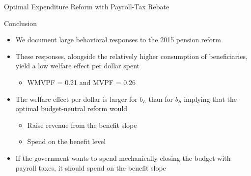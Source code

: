 \begin{frame}{Optimal Expenditure Reform with Payroll-Tax Rebate}
\centering
{}
\end{frame}

\begin{frame}{Conclusion}
    \begin{itemize}
        \item We document large behavioral responses to the 2015 pension reform
        \item These responses, alongside the relatively higher consumption of beneficiaries, yield a low welfare effect per dollar spent
        \begin{itemize}
            \item WMVPF = 0.21 and MVPF = 0.26
        \end{itemize}
        \item The welfare effect per dollar is larger for $b_L$ than for $b_S$ implying that the optimal budget-neutral reform would
        \begin{itemize}
            \item Raise revenue from the benefit slope
            \item Spend on the benefit level
        \end{itemize}
        \item If the government wants to spend mechanically closing the budget with payroll taxes, it should spend on the benefit slope
    \end{itemize}
\end{frame}

